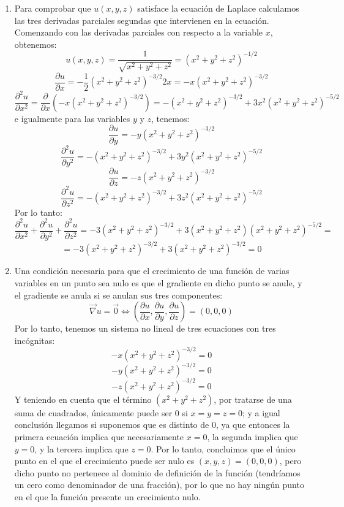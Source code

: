 {\begin{enumerate}
\item Para comprobar que $u(x,y,z)$ satisface la ecuación de Laplace
calculamos las tres derivadas parciales segundas que intervienen en
la ecuación. Comenzando con las derivadas parciales con respecto a
la variable $x$, obtenemos:
\[
u(x,y,z) = \frac{1}{{\sqrt {x^2  + y^2  + z^2 } }} = \left( {x^2  +
y^2  + z^2 } \right)^{ - 1/2}
\]
\[
\frac{{\partial u}}{{\partial x}} =  - \frac{1}{2}\left( {x^2  + y^2
+ z^2 } \right)^{ - 3/2} 2x =  - x\left( {x^2  + y^2  + z^2 }
\right)^{ - 3/2}
\]
\[
\frac{{\partial ^2 u}}{{\partial x^2 }} = \frac{\partial }{{\partial
x}}\left( { - x\left( {x^2  + y^2  + z^2 } \right)^{ - 3/2} }
\right) =  - \left( {x^2  + y^2  + z^2 } \right)^{ - 3/2}  + 3x^2
\left( {x^2  + y^2  + z^2 } \right)^{ - 5/2}
\]
e igualmente para las variables $y$ y $z$, tenemos:
\[
\frac{{\partial u}}{{\partial y}} =  - y\left( {x^2  + y^2  + z^2 }
\right)^{ - 3/2}
\]
\[
\frac{{\partial ^2 u}}{{\partial y^2 }} =  - \left( {x^2  + y^2  +
z^2 } \right)^{ - 3/2}  + 3y^2 \left( {x^2  + y^2  + z^2 } \right)^{
- 5/2}
\]
\[
\frac{{\partial u}}{{\partial z}} =  - z\left( {x^2  + y^2  + z^2 }
\right)^{ - 3/2}
\]
\[
\frac{{\partial ^2 u}}{{\partial z^2 }} =  - \left( {x^2  + y^2  +
z^2 } \right)^{ - 3/2}  + 3z^2 \left( {x^2  + y^2  + z^2 } \right)^{
- 5/2}
\]
Por lo tanto:
\[
\frac{{\partial ^2 u}}{{\partial x^2 }} + \frac{{\partial ^2
u}}{{\partial y^2 }} + \frac{{\partial ^2 u}}{{\partial z^2 }} =  -
3\left( {x^2  + y^2  + z^2 } \right)^{ - 3/2}  + 3\left( {x^2  + y^2
+ z^2 } \right)\left( {x^2  + y^2  + z^2 } \right)^{ - 5/2}  =
\]
\[
=- 3\left( {x^2  + y^2  + z^2 } \right)^{ - 3/2}  + 3\left( {x^2  +
y^2 + z^2 } \right)^{ - 3/2}  = 0
\]

\item Una condición necesaria para que el crecimiento de una función
de varias variables en un punto sea nulo es que el gradiente en
dicho punto se anule, y el gradiente se anula si se anulan sus tres
componentes:
\[
\vec \nabla u = \vec 0 \Leftrightarrow \left( {\frac{{\partial
u}}{{\partial x}},\frac{{\partial u}}{{\partial y}},\frac{{\partial
u}}{{\partial z}}} \right) = \left( {0,0,0} \right)
\]
Por lo tanto, tenemos un sistema no lineal de tres ecuaciones con
tres incógnitas:
\[
 - x\left( {x^2  + y^2  + z^2 } \right)^{ - 3/2}  = 0
\]
\[
 - y\left( {x^2  + y^2  + z^2 } \right)^{ - 3/2}  = 0
\]
\[
 - z\left( {x^2  + y^2  + z^2 } \right)^{ - 3/2}  = 0
\]
Y teniendo en cuenta que el término $(x^2+y^2+z^2)$, por tratarse de
una suma de cuadrados, únicamente puede ser 0 si $x=y=z=0$; y a
igual conclusión llegamos si suponemos que es distinto de 0, ya que
entonces la primera ecuación implica que necesariamente $x=0$, la
segunda implica que $y=0$, y la tercera implica que $z=0$. Por lo
tanto, concluimos que el único punto en el que el crecimiento puede
ser nulo es $(x,y,z)=(0,0,0)$, pero dicho punto no pertenece al
dominio de definición de la función (tendríamos un cero como
denominador de una fracción), por lo que no hay ningún punto en el
que la función presente un crecimiento nulo.


\end{enumerate}}
